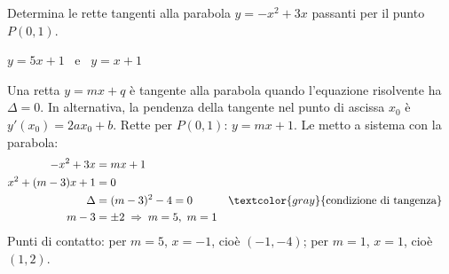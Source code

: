 
\begin{question}[ID=3.1, subtitle={Tangenti a $y=-x^2+3x$ per il punto $P(0,1)$}, difficulty=facile, tags={parabola, tangente}]
Determina le rette tangenti alla parabola $y=-x^2+3x$ passanti per il punto $P(0,1)$.
\begin{solution}
$y=5x+1$ \ e \ $y=x+1$
\end{solution}
\begin{explanation}
Una retta $y=mx+q$ è tangente alla parabola quando l'equazione risolvente ha $\Delta=0$. In alternativa, la pendenza della tangente nel punto di ascissa $x_0$ è $y'(x_0)=2ax_0+b$.
Rette per $P(0,1)$: $y=mx+1$. Le metto a sistema con la parabola:
\[\begin{aligned}
-x^2+3x &= mx+1\\
x^2+(m-3)x+1 &= 0\\
\Delta &= (m-3)^2-4=0 && \textcolor{gray}{\text{condizione di tangenza}}\\
m-3 &= \pm2 \;\Rightarrow\; m=5,\ m=1
\end{aligned}\]
Punti di contatto: per $m=5$, $x=-1$, cioè $(-1,-4)$; per $m=1$, $x=1$, cioè $(1,2)$.
\end{explanation}
\end{question}


